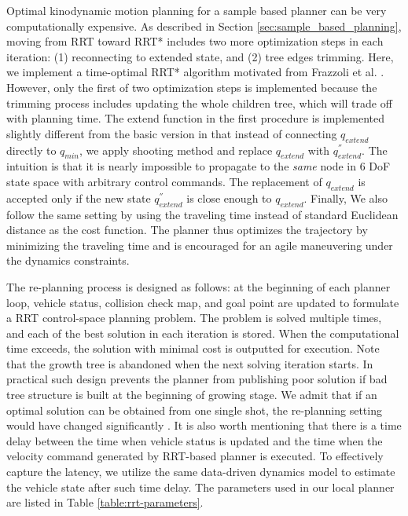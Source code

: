 \documentclass[../thesis.tex]{subfiles}
\begin{document}
Optimal kinodynamic motion planning for a sample based planner can be very computationally expensive.
As described in Section \ref{sec:sample_based_planning}, moving from RRT toward RRT* includes two more optimization steps in each iteration: (1) reconnecting to extended state, and (2) tree edges trimming. 
Here, we implement a time-optimal RRT* algorithm motivated from Frazzoli et al. \cite{hwan2011anytime}. 
However, only the first of two optimization steps is implemented because the trimming process includes updating the whole children tree, which will trade off with planning time. 
The extend function in the first procedure is implemented slightly different from the basic version in that instead of connecting $q_{extend}$ directly to $q_{min}$, we apply shooting method and replace $q_{extend}$ with $q^{''}_{extend}$. 
The intuition is that it is nearly impossible to propagate to the \textit{same} node in 6 DoF state space with arbitrary control commands. 
The replacement of $q_{extend}$ is accepted only if the new state $q^{''}_{extend}$ is close enough to $q_{extend}$. 
Finally, We also follow the same setting by using the traveling time instead of standard Euclidean distance as the cost function. 
The planner thus optimizes the trajectory by minimizing the traveling time and is encouraged for an agile maneuvering under the dynamics constraints.

The re-planning process is designed as follows: at the beginning of each planner loop, vehicle status, collision check map, and goal point are updated to formulate a RRT control-space planning problem. 
The problem is solved multiple times, and each of the best solution in each iteration is stored.
When the computational time exceeds, the solution with minimal cost is outputted for execution. 
Note that the growth tree is abandoned when the next solving iteration starts. 
In practical such design prevents the planner from publishing poor solution if bad tree structure is built at the beginning of growing stage. 
We admit that if an optimal solution can be obtained from one single shot, the re-planning setting would have changed significantly \cite{ferguson2006replanning}. 
It is also worth mentioning that there is a time delay between the time when vehicle status is updated and the time when the velocity command generated by RRT-based planner is executed. 
To effectively capture the latency, we utilize the same data-driven dynamics model to estimate the vehicle state after such time delay. 
The parameters used in our local planner are listed in Table \ref{table:rrt-parameters}. 
\end{document}
